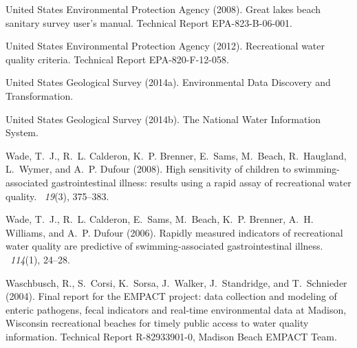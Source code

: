 \documentclass[authoryear,review, 12pt]{elsarticle}
\begin{document}
\begin{thebibliography}{}
{United States Environmental Protection Agency} (2008).
\newblock Great lakes beach sanitary survey user's manual.
\newblock Technical Report EPA-823-B-06-001.

{United States Environmental Protection Agency} (2012).
\newblock Recreational water quality criteria.
\newblock Technical Report EPA-820-F-12-058.

{United States Geological Survey} (2014a).
\newblock Environmental {D}ata {D}iscovery and {T}ransformation.

{United States Geological Survey} (2014b).
\newblock The {N}ational {W}ater {I}nformation {S}ystem.

Wade, T.~J., R.~L. Calderon, K.~P. Brenner, E.~Sams, M.~Beach, R.~Haugland,
  L.~Wymer, and A.~P. Dufour (2008).
\newblock High sensitivity of children to swimming-associated gastrointestinal
  illness: results using a rapid assay of recreational water quality.
~{\em 19\/}(3), 375--383.

Wade, T.~J., R.~L. Calderon, E.~Sams, M.~Beach, K.~P. Brenner, A.~H. Williams,
  and A.~P. Dufour (2006).
\newblock Rapidly measured indicators of recreational water quality are
  predictive of swimming-associated gastrointestinal illness.
~{\em 114\/}(1), 24--28.

Waschbusch, R., S.~Corsi, K.~Sorsa, J.~Walker, J.~Standridge, and T.~Schnieder
  (2004).
\newblock Final report for the {EMPACT} project: data collection and modeling
  of enteric pathogens, fecal indicators and real-time environmental data at
  {Madison, Wisconsin} recreational beaches for timely public access to water
  quality information.
\newblock Technical Report R-82933901-0, Madison Beach EMPACT Team.


\end{thebibliography}
\end{document}
